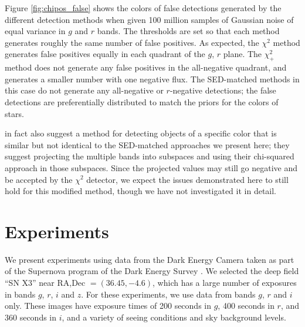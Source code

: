 \documentclass[11pt,letterpaper,linenumbers]{aastex63}
\newcommand{\chipos}{\chi_+}
\begin{document}
Figure \ref{fig:chipos_false} shows the colors of false detections
generated by the different detection methods when given 100 million
samples of Gaussian noise of equal variance in $g$ and $r$ bands.  The
thresholds are set so that each method generates roughly the same
number of false positives.  As expected, the $\chi^2$ method generates
false positives equally in each quadrant of the $g$, $r$ plane.  The
$\chipos^2$ method does not generate any false positives in the
all-negative quadrant, and generates a smaller number with one
negative flux.  The SED-matched methods in this case do not generate
any all-negative or $r$-negative detections; the false detections are
preferentially distributed to match the priors for the colors of
stars.



\cite{szalay1999} in fact also suggest a method for detecting objects
of a specific color that is similar but not identical to the
SED-matched approaches we present here; they suggest projecting the
multiple bands into subspaces and using their chi-squared approach in
those subspaces.  Since the projected values may still go negative and
be accepted by the $\chi^2$ detector, we expect the issues
demonstrated here to still hold for this modified method, though we
have not investigated it in detail.


\section{Experiments}




We present experiments using data from the Dark Energy Camera
\citep{decam} taken as part of the Supernova program \citep{dessn} of
the Dark Energy Survey \citep{des}.  We selected the deep field ``SN
X3'' near RA,Dec $= (36.45, -4.6)$, which has a large number of
exposures in bands $g$, $r$, $i$ and $z$.  For these experiments, we
use data from bands $g$, $r$ and $i$ only.  These images have exposure
times of 200 seconds in $g$, 400 seconds in $r$, and 360 seconds in
$i$, and a variety of seeing conditions and sky background levels.
\end{document}
